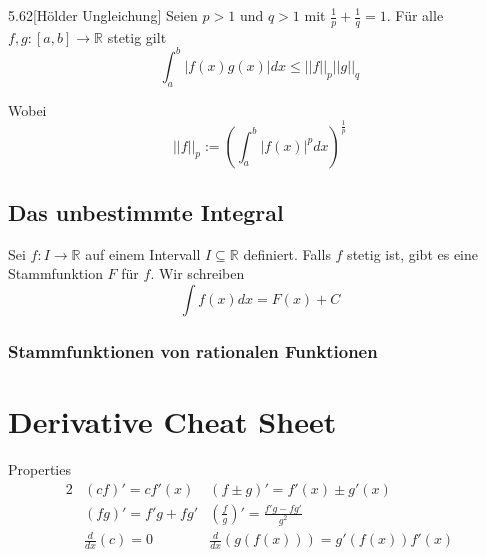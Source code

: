 \documentclass[8pt,a4paper,twocolumn,table]{extarticle}
\newcommand{\R}{\mathbb{R}}
\begin{document}
\begin{satz}{5.62}[Hölder Ungleichung]
    Seien $p > 1$ und $q > 1$ mit $\frac{1}{p} + \frac{1}{q} = 1$.
    Für alle $f, g: [a,b] \to \R$ stetig gilt
    \[ \int_a^b |f(x)g(x)|dx \le ||f||_p||g||_q \]

    Wobei
    \[ ||f||_p := \left( \int_a^b |f(x)|^p dx \right)^{\frac{1}{p}} \]
\end{satz}

\subsection{Das unbestimmte Integral}

Sei $f: I \to \R$ auf einem Intervall $I \subseteq \R$ definiert. Falls $f$ stetig ist, gibt es eine Stammfunktion $F$ für $f$. Wir schreiben
\[ \int f(x)dx = F(x) + C \]

\subsubsection{Stammfunktionen von rationalen Funktionen}

\section{Derivative Cheat Sheet}

Properties
\begin{alignat*}{2}
     & (cf)' = c f'(x)     & (f \pm g)' = f'(x) \pm g'(x)                       \\
     & (fg)' = f'g + fg'   & (\frac{f}{g})' = \frac{f'g - fg'}{g^2}             \\
     & \frac{d}{dx}(c) = 0 & \frac{d}{dx}\left( g(f(x)) \right) = g'(f(x))f'(x)
\end{alignat*}
\end{document}
